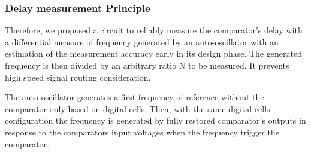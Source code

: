 \subsubsection{Delay measurement Principle}
Therefore, we proposed a circuit to reliably measure the comparator's delay with a differential measure of frequency generated by an auto-oscillator with an estimation of the measurement accuracy early in its design phase. The generated frequency is then divided by an arbitrary ratio N to be measured. It prevents high speed signal routing consideration.

The auto-oscillator generates a first frequency of reference without the comparator only based on digital cells. Then, with the same digital cells configuration the frequency is generated by fully restored comparator's outputs in response to the comparators input voltages when the frequency trigger the comparator.

